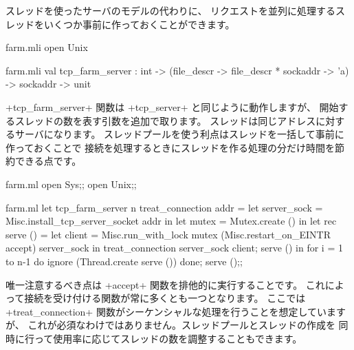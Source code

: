 \begin{example}
スレッドを使ったサーバのモデルの代わりに、
リクエストを並列に処理するスレッドをいくつか事前に作っておくことができます。
%
\begin{codefile}{farm.mli}
open Unix
\end{codefile}
%
\begin{listingcodefile}{farm.mli}
val tcp_farm_server :
  int -> (file_descr -> file_descr * sockaddr -> 'a) -> sockaddr -> unit
\end{listingcodefile}
%
\ml+tcp_farm_server+ 関数は \ml+tcp_server+ と同じように動作しますが、
開始するスレッドの数を表す引数を追加で取ります。
スレッドは同じアドレスに対するサーバになります。
スレッドプールを使う利点はスレッドを一括して事前に作っておくことで
接続を処理するときにスレッドを作る処理の分だけ時間を節約できる点です。
%
\begin{codefile}{farm.ml}
open Sys;;
open Unix;;
\end{codefile}
%
\begin{listingcodefile}{farm.ml}
let tcp_farm_server n treat_connection addr =
  let server_sock = Misc.install_tcp_server_socket addr in
  let mutex = Mutex.create () in
  let rec serve () =
    let client =
      Misc.run_with_lock mutex
        (Misc.restart_on_EINTR accept) server_sock in
    treat_connection server_sock client;
    serve () in
  for i = 1 to n-1 do ignore (Thread.create serve ()) done;
  serve ();;
\end{listingcodefile}
唯一注意するべき点は \ml+accept+ 関数を排他的に実行することです。
これによって接続を受け付ける関数が常に多くとも一つとなります。
ここでは \ml+treat_connection+ 関数がシーケンシャルな処理を行うことを想定していますが、
これが必須なわけではありません。スレッドプールとスレッドの作成を
同時に行って使用率に応じてスレッドの数を調整することもできます。
\end{example}

